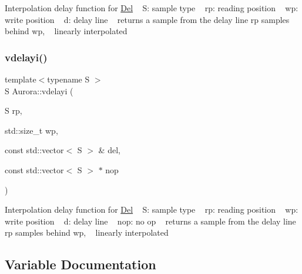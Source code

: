 Interpolation delay function for \hyperlink{class_aurora_1_1_del}{Del} ~\newline
S\+: sample type ~\newline
rp\+: reading position ~\newline
wp\+: write position ~\newline
d\+: delay line ~\newline
returns a sample from the delay line rp samples behind wp, ~\newline
linearly interpolated \mbox{\label{namespace_aurora_aa162bda687dbe871e0517cfae199378c}} 
\subsubsection{\texorpdfstring{vdelayi()}{vdelayi()}\hspace{0.1cm}{\footnotesize\ttfamily [2/2]}}
{\footnotesize\ttfamily template$<$typename S $>$ \\
S Aurora\+::vdelayi (\begin{DoxyParamCaption}\item[{S}]{rp,  }\item[{std\+::size\+\_\+t}]{wp,  }\item[{const std\+::vector$<$ S $>$ \&}]{del,  }\item[{const std\+::vector$<$ S $>$ $\ast$}]{nop }\end{DoxyParamCaption})\hspace{0.3cm}{\ttfamily [inline]}}

Interpolation delay function for \hyperlink{class_aurora_1_1_del}{Del} ~\newline
S\+: sample type ~\newline
rp\+: reading position ~\newline
wp\+: write position ~\newline
d\+: delay line ~\newline
nop\+: no op ~\newline
returns a sample from the delay line rp samples behind wp, ~\newline
linearly interpolated 

\subsection{Variable Documentation}
\mbox{\label{namespace_aurora_acb267dff62f74484893c2d5b679b78bf}} 
